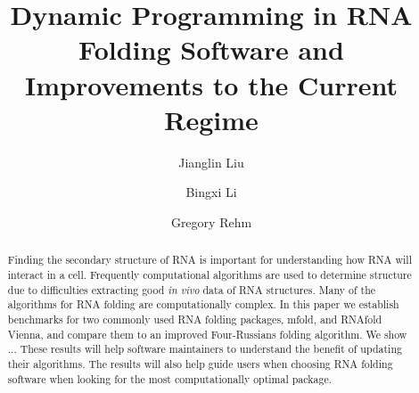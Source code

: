 \documentclass[12pt]{article}
\title{Dynamic Programming in RNA Folding Software and Improvements to the Current Regime}
\begin{document}
\author{Jianglin Liu}
\author{Bingxi Li}
\author{Gregory Rehm}
\maketitle

\begin{abstract}
Finding the secondary structure of RNA is important for understanding how RNA will interact in a cell. Frequently computational algorithms are used to determine structure due to difficulties extracting good \textit{in vivo} data of RNA structures. Many of the algorithms for RNA folding are computationally complex. In this paper we establish benchmarks for two commonly used RNA folding packages, mfold, and RNAfold Vienna, and compare them to an improved Four-Russians folding algorithm. We show ... These results will help software maintainers to understand the benefit of updating their algorithms. The results will also help guide users when choosing RNA folding software when looking for the most computationally optimal package.
\end{abstract}
\end{document}
